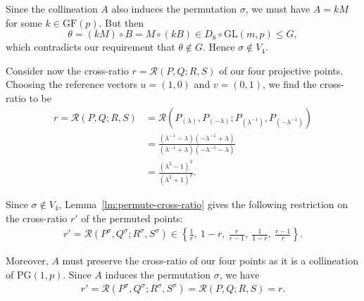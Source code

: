 \documentclass[10pt]{amsart}
\theoremstyle{definition}
\theoremstyle{plain}
\theoremstyle{plain}
\theoremstyle{plain}
\theoremstyle{plain}
\newcommand{\GF}{\mathrm{GF}}
\newcommand{\GL}{\mathrm{GL}}
\newcommand{\PG}{\mathrm{PG}}
\begin{document}
Since the collineation $A$ also induces the permutation $\sigma$, we must have $A = kM$ for some $k \in \GF{\left(p \right)}$. But then
\begin{displaymath}
\theta = \left(kM \right) \circ B = M \circ \left(kB \right) \in D_8 \circ \GL{\left(m, p \right)} \leqslant G,
\end{displaymath}
which contradicts our requirement that $\theta \notin G$. Hence $\sigma \notin V_4$.

Consider now the cross-ratio $r = \mathcal{R}{\left(P, Q; R, S \right)}$ of our four projective points. Choosing the reference vectors $u = \left(1, 0 \right)$ and $v = \left(0, 1 \right)$, we find the cross-ratio to be
\begin{align*}
r = \mathcal{R}{\left(P, Q; R, S \right)} &= \mathcal{R}{\left(P_{\left(\lambda \right)}, P_{\left(-\lambda \right)}; P_{\left(\lambda^{-1} \right)}, P_{\left(-\lambda^{-1} \right)}\right)} \\
&= \frac{\left(\lambda^{-1} - \lambda \right) \left(-\lambda^{-1} + \lambda \right)}{\left(\lambda^{-1} + \lambda \right) \left(-\lambda^{-1} - \lambda \right)} \\
&= \frac{\left(\lambda^2 - 1 \right)^2}{\left(\lambda^2 + 1 \right)^2}.
\end{align*}

Since $\sigma \notin V_4$, Lemma~\ref{lm:permute-cross-ratio} gives the following restriction on the cross-ratio $r'$ of the permuted points:
\begin{align} \label{eqn:cross-ratio-possibilities}
r' = \mathcal{R}{\left(P^\sigma, Q^\sigma; R^\sigma, S^\sigma \right)} \in {\left\{\frac{1}{r},\ 1-r,\ \frac{r}{r-1},\ \frac{1}{1-r},\ \frac{r-1}{r} \right\}}.
\end{align}

Moreover, $A$ must preserve the cross-ratio of our four points as it is a collineation of $\PG{\left(1, p \right)}$. Since $A$ induces the permutation $\sigma$, we have
\begin{align} \label{eqn:cross-ratio-preserved}
r' = \mathcal{R}{\left(P^\sigma, Q^\sigma; R^\sigma, S^\sigma \right)} = \mathcal{R}{\left(P, Q; R, S \right)} = r.
\end{align}
\end{document}
